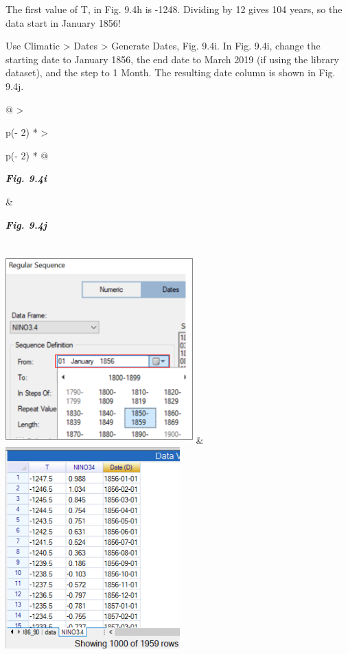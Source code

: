 \documentclass[
  letterpaper,
  DIV=11,
  numbers=noendperiod]{scrreprt}
\begin{document}
The first value of T, in Fig. 9.4h is -1248. Dividing by 12 gives 104
years, so the data start in January 1856!

Use Climatic \textgreater{} Dates \textgreater{} Generate Dates, Fig.
9.4i. In Fig. 9.4i, change the starting date to January 1856, the end
date to March 2019 (if using the library dataset), and the step to 1
Month. The resulting date column is shown in Fig. 9.4j.

\begin{longtable}[]{@{}
  >{\raggedright\arraybackslash}p{(\columnwidth - 2\tabcolsep) * }
  >{\raggedright\arraybackslash}p{(\columnwidth - 2\tabcolsep) * }@{}}
\toprule\noalign{}
\begin{minipage}[b]{\linewidth}\raggedright
\textbf{\emph{Fig. 9.4i}}
\end{minipage} & \begin{minipage}[b]{\linewidth}\raggedright
\textbf{\emph{Fig. 9.4j}}
\end{minipage} \\
\midrule\noalign{}
\endhead
\bottomrule\noalign{}
\endlastfoot
\includegraphics[width=2.84199in,height=2.86736in]{figures/Fig9.4i.png}
&
\includegraphics[width=2.64771in,height=3.06124in]{figures/Fig9.4j.png} \\
\end{longtable}
\end{document}
